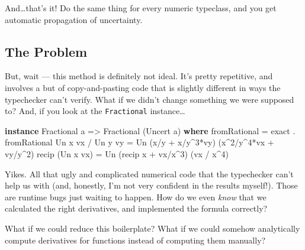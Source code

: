 \documentclass[]{article}
\newenvironment{Shaded}{}{}
\newcommand{\DataTypeTok}[1]{\textcolor[rgb]{0.56,0.13,0.00}{#1}}
\newcommand{\DecValTok}[1]{\textcolor[rgb]{0.25,0.63,0.44}{#1}}
\newcommand{\FunctionTok}[1]{\textcolor[rgb]{0.02,0.16,0.49}{#1}}
\newcommand{\KeywordTok}[1]{\textcolor[rgb]{0.00,0.44,0.13}{\textbf{#1}}}
\newcommand{\NormalTok}[1]{#1}
\newcommand{\OperatorTok}[1]{\textcolor[rgb]{0.40,0.40,0.40}{#1}}
\newcommand{\OtherTok}[1]{\textcolor[rgb]{0.00,0.44,0.13}{#1}}
\begin{document}
And\ldots that's it! Do the same thing for every numeric typeclass, and you get
automatic propagation of uncertainty.

\subsection{The Problem}\label{the-problem}

But, wait --- this method is definitely not ideal. It's pretty repetitive, and
involves a but of copy-and-pasting code that is slightly different in ways the
typechecker can't verify. What if we didn't change something we were supposed
to? And, if you look at the \texttt{Fractional} instance\ldots{}

\begin{Shaded}
\begin{Highlighting}[]
\KeywordTok{instance} \DataTypeTok{Fractional}\NormalTok{ a }\OtherTok{=\textgreater{}} \DataTypeTok{Fractional}\NormalTok{ (}\DataTypeTok{Uncert}\NormalTok{ a) }\KeywordTok{where}
    \FunctionTok{fromRational}      \OtherTok{=}\NormalTok{ exact }\OperatorTok{.} \FunctionTok{fromRational}
    \DataTypeTok{Un}\NormalTok{ x vx }\OperatorTok{/} \DataTypeTok{Un}\NormalTok{ y vy }\OtherTok{=} \DataTypeTok{Un}\NormalTok{ (x}\OperatorTok{/}\NormalTok{y }\OperatorTok{+}\NormalTok{ x}\OperatorTok{/}\NormalTok{y}\OperatorTok{\^{}}\DecValTok{3}\OperatorTok{*}\NormalTok{vy)   (x}\OperatorTok{\^{}}\DecValTok{2}\OperatorTok{/}\NormalTok{y}\OperatorTok{\^{}}\DecValTok{4}\OperatorTok{*}\NormalTok{vx }\OperatorTok{+}\NormalTok{ vy}\OperatorTok{/}\NormalTok{y}\OperatorTok{\^{}}\DecValTok{2}\NormalTok{)}
    \FunctionTok{recip}\NormalTok{ (}\DataTypeTok{Un}\NormalTok{ x vx)   }\OtherTok{=} \DataTypeTok{Un}\NormalTok{ (}\FunctionTok{recip}\NormalTok{ x }\OperatorTok{+}\NormalTok{ vx}\OperatorTok{/}\NormalTok{x}\OperatorTok{\^{}}\DecValTok{3}\NormalTok{) (vx }\OperatorTok{/}\NormalTok{ x}\OperatorTok{\^{}}\DecValTok{4}\NormalTok{)}
\end{Highlighting}
\end{Shaded}

Yikes. All that ugly and complicated numerical code that the typechecker can't
help us with (and, honestly, I'm not very confident in the results myself!).
Those are runtime bugs just waiting to happen. How do we even \emph{know} that
we calculated the right derivatives, and implemented the formula correctly?

What if we could reduce this boilerplate? What if we could somehow analytically
compute derivatives for functions instead of computing them manually?
\end{document}
